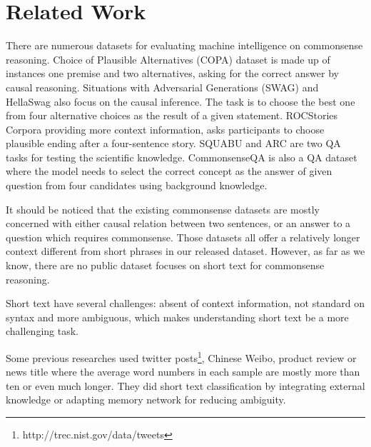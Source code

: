 \section{Related Work}

There are numerous datasets for evaluating machine intelligence on commonsense 
reasoning. Choice of Plausible Alternatives (COPA) \cite{roemmele2011choice} 
dataset is made up of instances one premise and two alternatives, 
asking for the correct answer by causal reasoning. %
Situations with Adversarial Generations (SWAG) \cite{zellers2018swag} and HellaSwag \cite{DBLP:journals/corr/abs-1905-07830}
also focus on the causal inference. 
The task is to choose the best one from four alternative choices as the result of a given statement. ROCStories Corpora \cite{mostafazadeh2016corpus} %
providing more context information, asks participants to choose plausible ending after a four-sentence story. SQUABU \cite{davis2016write} and ARC \cite{clark2018think} are two QA tasks for testing the scientific knowledge. CommonsenseQA \cite{talmor2019commonsenseqa} is also a QA dataset where the model needs to select the correct concept as the answer of given question from four candidates using background knowledge.

It should be noticed that the existing commonsense datasets are mostly concerned 
with either causal relation between two sentences, or an answer to a question which 
requires commonsense. Those datasets all offer a relatively longer context different 
from short phrases in our released dataset. 
However, as far as we know, there are no public dataset focuses on short text for commonsense reasoning. 

Short text have several challenges: absent of context information, not standard on syntax and more ambiguous, which makes understanding short text be a more challenging task.%
 
Some previous researches used twitter posts\footnote{http://trec.nist.gov/data/tweets}, Chinese Weibo\cite{he2016extracting}, product review\cite{pang2005seeing} or news title\cite{vitale2012classification} where the average word numbers in each sample are mostly more than ten or even much longer. They did short text classification by integrating external knowledge\cite{wang2017combining,chen2019deep} or adapting memory network\cite{zeng2018topic} for reducing ambiguity. 

